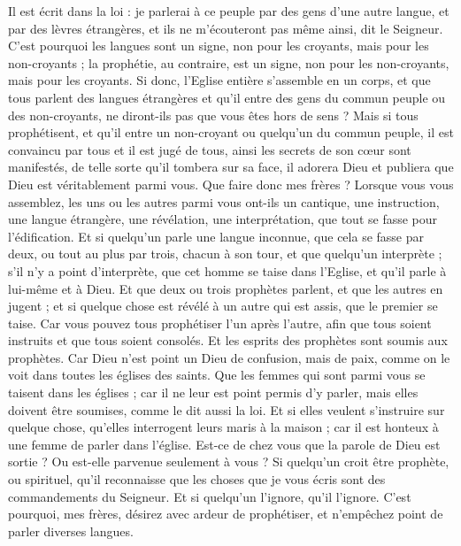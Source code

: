 \begin{multicols}{2}
Il est écrit dans la loi : je parlerai à ce peuple par des gens d'une autre langue, et par des lèvres étrangères, et ils ne m’écouteront pas même ainsi, dit le Seigneur.
C’est pourquoi les langues sont un signe, non pour les croyants, mais pour les non-croyants ; la prophétie, au contraire, est un signe, non pour les non-croyants, mais pour les croyants.
Si donc, l’Eglise entière s'assemble en un corps, et que tous parlent des langues étrangères et qu'il entre des gens du commun peuple ou des non-croyants, ne diront-ils pas que vous êtes hors de sens ?
Mais si tous prophétisent, et qu'il entre un non-croyant ou quelqu'un du commun peuple, il est convaincu par tous et il est jugé de tous,
ainsi les secrets de son cœur sont manifestés, de telle sorte qu'il tombera sur sa face, il adorera Dieu et publiera que Dieu est véritablement parmi vous.
Que faire donc mes frères ? Lorsque vous vous assemblez, les uns ou les autres parmi vous ont-ils un cantique, une instruction, une langue étrangère, une révélation, une interprétation, que tout se fasse pour l'édification.
Et si quelqu'un parle une langue inconnue, que cela se fasse par deux, ou tout au plus par trois, chacun à son tour, et que quelqu’un interprète ;
s'il n'y a point d'interprète, que cet homme se taise dans l'Eglise, et qu'il parle à lui-même et à Dieu.
Et que deux ou trois prophètes parlent, et que les autres en jugent ;
et si quelque chose est révélé à un autre qui est assis, que le premier se taise.
Car vous pouvez tous prophétiser l'un après l'autre, afin que tous soient instruits et que tous soient consolés.
Et les esprits des prophètes sont soumis aux prophètes.
Car Dieu n'est point un Dieu de confusion, mais de paix, comme on le voit dans toutes les églises des saints.
Que les femmes qui sont parmi vous se taisent dans les églises ; car il ne leur est point permis d’y parler, mais elles doivent être soumises, comme le dit aussi la loi.
Et si elles veulent s’instruire sur quelque chose, qu'elles interrogent leurs maris à la maison ; car il est honteux à une femme de parler dans l'église.
Est-ce de chez vous que la parole de Dieu est sortie ? Ou est-elle parvenue seulement à vous ?
Si quelqu'un croit être prophète, ou spirituel, qu'il reconnaisse que les choses que je vous écris sont des commandements du Seigneur.
Et si quelqu'un l’ignore, qu'il l’ignore.
C'est pourquoi, mes frères, désirez avec ardeur de prophétiser, et n'empêchez point de parler diverses langues.

\end{multicols}
